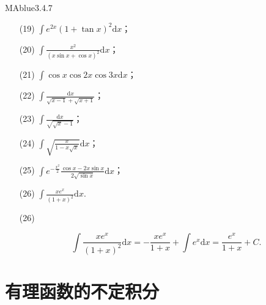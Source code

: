 \begin{problem}{MAblue}{3.4.7}
\begin{multicols}{2}
\begin{enumerate}
            \item[(19)]
            $\displaystyle \int e^{2x} (1+\tan x)^2 \mathrm dx$；
            \item[(20)]
            $\displaystyle \int \frac{x^2}{(x \sin x + \cos x)^2} \mathrm dx$；
            \item[(21)]
            $\displaystyle \int \cos x \cos 2x \cos 3x \mathrm dx$；
            \item[(22)]
            $\displaystyle \int \frac{\mathrm dx}{\sqrt{x-1}+\sqrt{x+1}}$；
            \item[(23)]
            $\displaystyle \int \frac{\mathrm dx}{\sqrt{\sqrt x - 1}}$；
            \item[(24)]
            $\displaystyle \int \sqrt{\frac x {1-x\sqrt x}} \mathrm dx$；
            \item[(25)]
            $\displaystyle \int e^{-\frac {x^2} 2} \frac{\cos x - 2x \sin x}{2 \sqrt{\sin x}} \mathrm dx$；
            \item[(26)]
            $\displaystyle \int \frac{xe^x}{(1+x)^2} \mathrm dx$.
        \end{enumerate}
    \end{multicols}
\end{problem}

\begin{enumerate}
    \item[(26)]
    \begin{solution}
        \[
            \int \frac{xe^x}{(1+x)^2} \mathrm dx = -\frac{xe^x}{1+x} + \int e^x \mathrm dx = \frac{e^x}{1+x} + C.
        \]
    \end{solution}
\end{enumerate}

\section{有理函数的不定积分}

